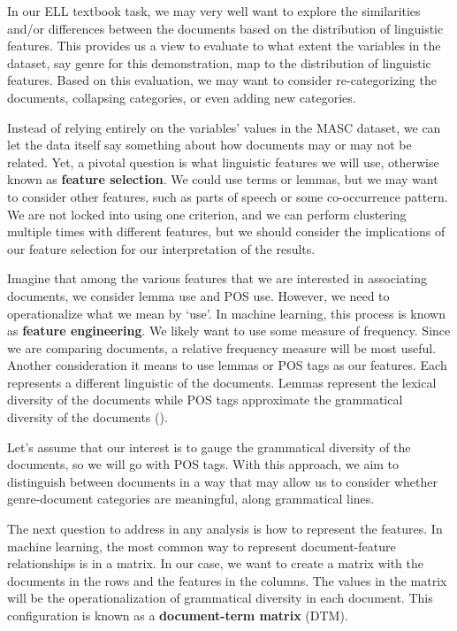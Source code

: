 \documentclass[
  letterpaper,
  krantz1]{latex/krantz-mod}
\theoremstyle{definition}
\theoremstyle{definition}
\theoremstyle{remark}
\begin{document}
In our ELL textbook task, we may very well want to explore the
similarities and/or differences between the documents based on the
distribution of linguistic features. This provides us a view to evaluate
to what extent the variables in the dataset, say genre for this
demonstration, map to the distribution of linguistic features. Based on
this evaluation, we may want to consider re-categorizing the documents,
collapsing categories, or even adding new categories.

Instead of relying entirely on the variables' values in the MASC
dataset, we can let the data itself say something about how documents
may or may not be related. Yet, a pivotal question is what linguistic
features we will use, otherwise known as \textbf{feature
selection}. We could use terms or lemmas, but
we may want to consider other features, such as parts of speech or some
co-occurrence pattern. We are not locked into using one criterion, and
we can perform clustering multiple times with different features, but we
should consider the implications of our feature selection for our
interpretation of the results.

Imagine that among the various features that we are interested in
associating documents, we consider lemma use and POS use. However, we
need to operationalize what we mean by `use'. In
machine learning, this process is known as \textbf{feature
engineering}. We likely want to use some
measure of frequency. Since we are comparing documents, a relative
frequency measure will be most useful. Another consideration it means to
use lemmas or POS tags as our features. Each represents a different
linguistic of the documents. Lemmas represent the lexical
diversity of the documents while POS tags
approximate the grammatical diversity of
the documents ().

Let's assume that our interest is to gauge the grammatical diversity of
the documents, so we will go with POS tags. With this approach, we aim
to distinguish between documents in a way that may allow us to consider
whether genre-document categories are meaningful, along grammatical
lines.

The next question to address in any analysis is how to represent the
features. In machine learning, the most common way to represent
\mbox{document-feature} relationships is in a matrix. In
our case, we want to create a matrix with the documents in the rows and
the features in the columns. The values in the matrix will be the
operationalization of grammatical diversity in
each document. This configuration is known as a \textbf{document-term
matrix} (DTM).
\end{document}
